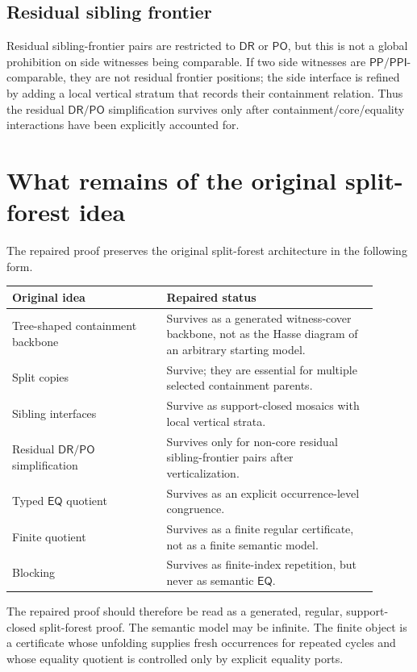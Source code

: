 \documentclass[11pt]{article}
\newcommand{\EQ}{\mathsf{EQ}}
\newcommand{\PP}{\mathsf{PP}}
\newcommand{\PPI}{\mathsf{PPI}}
\newcommand{\PO}{\mathsf{PO}}
\newcommand{\DR}{\mathsf{DR}}
\begin{document}
\subsection{Residual sibling frontier}
Residual sibling-frontier pairs are restricted to \(\DR\) or \(\PO\), but this is not a global prohibition on side witnesses being comparable.  If two side witnesses are \(\PP/\PPI\)-comparable, they are not residual frontier positions; the side interface is refined by adding a local vertical stratum that records their containment relation.  Thus the residual \(\DR/\PO\) simplification survives only after containment/core/equality interactions have been explicitly accounted for.

\section{What remains of the original split-forest idea}

The repaired proof preserves the original split-forest architecture in the following form.
\begin{center}
\begin{tabular}{p{0.38\linewidth}p{0.52\linewidth}}
\toprule
Original idea & Repaired status \\
\midrule
Tree-shaped containment backbone & Survives as a generated witness-cover backbone, not as the Hasse diagram of an arbitrary starting model. \\
Split copies & Survive; they are essential for multiple selected containment parents. \\
Sibling interfaces & Survive as support-closed mosaics with local vertical strata. \\
Residual \(\DR/\PO\) simplification & Survives only for non-core residual sibling-frontier pairs after verticalization. \\
Typed \(\EQ\) quotient & Survives as an explicit occurrence-level congruence. \\
Finite quotient & Survives as a finite regular certificate, not as a finite semantic model. \\
Blocking & Survives as finite-index repetition, but never as semantic \(\EQ\). \\
\bottomrule
\end{tabular}
\end{center}

The repaired proof should therefore be read as a generated, regular, support-closed split-forest proof.  The semantic model may be infinite.  The finite object is a certificate whose unfolding supplies fresh occurrences for repeated cycles and whose equality quotient is controlled only by explicit equality ports.
\end{document}
